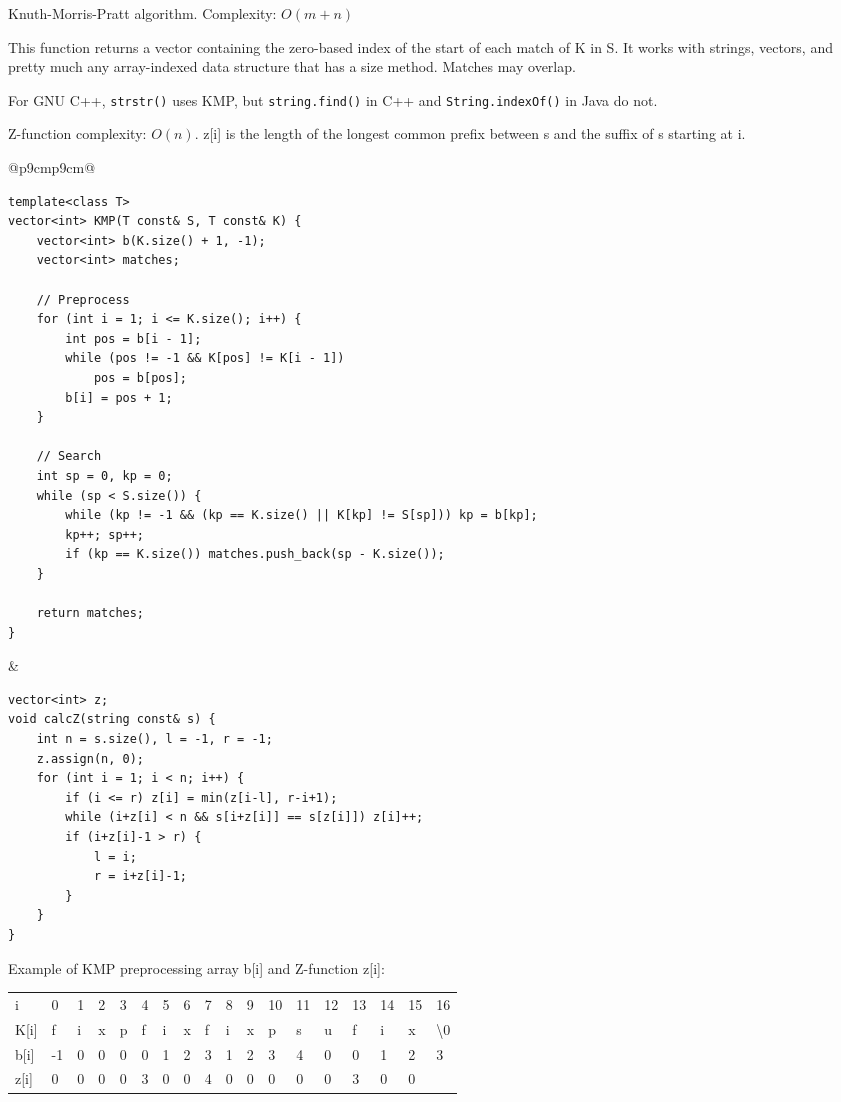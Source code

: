 \documentclass[letterpaper]{article}
\begin{document}
Knuth-Morris-Pratt algorithm. Complexity: $O\left(m+n\right)$

This function returns a vector containing the zero-based index of the start of each match of K in S. It works with strings, vectors, and pretty much any array-indexed data structure that has a size method. Matches may overlap.

For GNU C++, \texttt{strstr()} uses KMP, but \texttt{string.find()} in C++ and \texttt{String.indexOf()} in Java do not.

Z-function complexity: $O\left(n\right)$. z[i] is the length of the longest common prefix between s and the suffix of s starting at i.
\begin{tabular}{@{}p{9cm}p{9cm}@{}}
    \begin{lstlisting}
template<class T>
vector<int> KMP(T const& S, T const& K) {
	vector<int> b(K.size() + 1, -1);
	vector<int> matches;

	// Preprocess
	for (int i = 1; i <= K.size(); i++) {
		int pos = b[i - 1];
		while (pos != -1 && K[pos] != K[i - 1])
			pos = b[pos];
		b[i] = pos + 1;
	}

	// Search
	int sp = 0, kp = 0;
	while (sp < S.size()) {
		while (kp != -1 && (kp == K.size() || K[kp] != S[sp])) kp = b[kp];
		kp++; sp++;
		if (kp == K.size()) matches.push_back(sp - K.size());
	}

	return matches;
}
\end{lstlisting}
     &
    \begin{lstlisting}
vector<int> z;
void calcZ(string const& s) {
	int n = s.size(), l = -1, r = -1;
	z.assign(n, 0);
	for (int i = 1; i < n; i++) {
		if (i <= r) z[i] = min(z[i-l], r-i+1);
		while (i+z[i] < n && s[i+z[i]] == s[z[i]]) z[i]++;
		if (i+z[i]-1 > r) {
			l = i;
			r = i+z[i]-1;
		}
	}
}
\end{lstlisting}
\end{tabular}

Example of KMP preprocessing array b[i] and Z-function z[i]:

{
\fontfamily{\ttdefault}\selectfont
\begin{tabular}{llllllllllllllllll}
    i    & 0  & 1 & 2 & 3 & 4 & 5 & 6 & 7 & 8 & 9 & 10 & 11 & 12 & 13 & 14 & 15 & 16               \\
    K[i] & f  & i & x & p & f & i & x & f & i & x & p  & s  & u  & f  & i  & x  & \textbackslash 0 \\
    b[i] & -1 & 0 & 0 & 0 & 0 & 1 & 2 & 3 & 1 & 2 & 3  & 4  & 0  & 0  & 1  & 2  & 3                \\
    z[i] & 0  & 0 & 0 & 0 & 3 & 0 & 0 & 4 & 0 & 0 & 0  & 0  & 0  & 3  & 0  & 0  &
\end{tabular}
}
\end{document}
